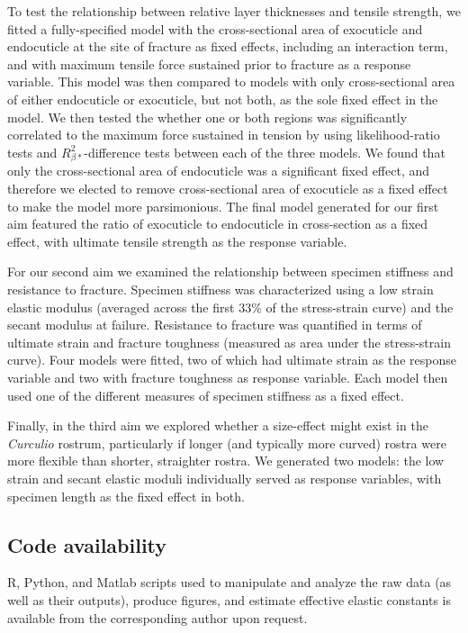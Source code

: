 \documentclass[twocolumn, linenumbers, superscriptaddress, nofootinbib]{revtex4-1}
\begin{document}
				To test the relationship between relative layer thicknesses and tensile strength, we fitted a fully-specified model with the cross-sectional area of exocuticle and endocuticle at the site of fracture as fixed effects, including an interaction term, and with maximum tensile force sustained prior to fracture as a response variable.
				This model was then compared to models with only cross-sectional area of either endocuticle or exocuticle, but not both, as the sole fixed effect in the model.
				We then tested the whether one or both regions was significantly correlated to the maximum force sustained in tension by using likelihood-ratio tests and $R^{2}_{\beta*}$-difference tests between each of the three models.
				We found that only the cross-sectional area of endocuticle was a significant fixed effect, and therefore we elected to remove cross-sectional area of exocuticle as a fixed effect to make the model more parsimonious.
				The final model generated for our first aim featured the ratio of exocuticle to endocuticle in cross-section as a fixed effect, with ultimate tensile strength as the response variable.
				
				For our second aim we examined the relationship between specimen stiffness and resistance to fracture.
				Specimen stiffness was characterized using a low strain elastic modulus (averaged across the first 33\% of the stress-strain curve) and the secant modulus at failure.
				Resistance to fracture was quantified in terms of ultimate strain and fracture toughness (measured as area under the stress-strain curve).
				Four models were fitted, two of which had ultimate strain as the response variable and two with fracture toughness as response variable.
				Each model then used one of the different measures of specimen stiffness as a fixed effect.
				
				Finally, in the third aim we explored whether a size-effect might exist in the \textit{Curculio} rostrum, particularly if longer (and typically more curved) rostra were more flexible than shorter, straighter rostra.
				We generated two models: the low strain and secant elastic moduli individually served as response variables, with specimen length as the fixed effect in both.

		\subsection*{Code availability}
			R, Python, and Matlab scripts used to manipulate and analyze the raw data (as well as their outputs), produce figures, and estimate effective elastic constants is available from the corresponding author upon request.
			
\end{document}
